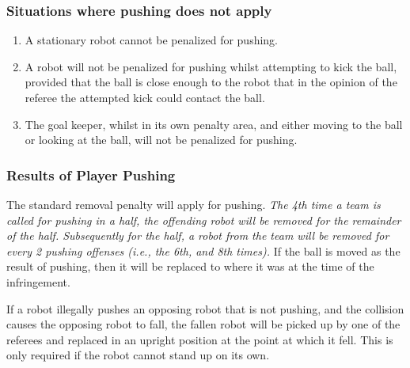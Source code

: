 \documentclass[12pt]{article}
\begin{document}
\subsubsection{Situations where pushing does not apply}
\label{sec:not_pushing}

\begin{enumerate}

\item A stationary robot cannot be penalized for pushing.

\item A robot will not be penalized for pushing whilst attempting to kick the ball, provided that the ball is close enough to the robot that in the opinion of the referee the attempted kick could contact the ball.

\item The goal keeper, whilst in its own penalty area, and either moving to the ball or looking at the ball, will not be penalized for pushing.




\end{enumerate}

\subsubsection{Results of Player Pushing}
\label{sec:pushing_results}

The standard removal penalty will apply for pushing. \emph{The 4th time a team is called for pushing in a half, the offending robot will be removed for the remainder of the half. Subsequently for the half, a robot from the team will be removed for every 2 pushing offenses (i.e., the 6th, and 8th times).} If the ball is moved as the result of pushing, then it will be replaced to where it was at the time of the infringement.

If a robot illegally pushes an opposing robot that is not pushing, and the collision causes the opposing robot to fall, the fallen robot will be picked up by one of the referees and replaced in an upright position at the point at which it fell. This is only required if the robot cannot stand up on its own.
\end{document}
